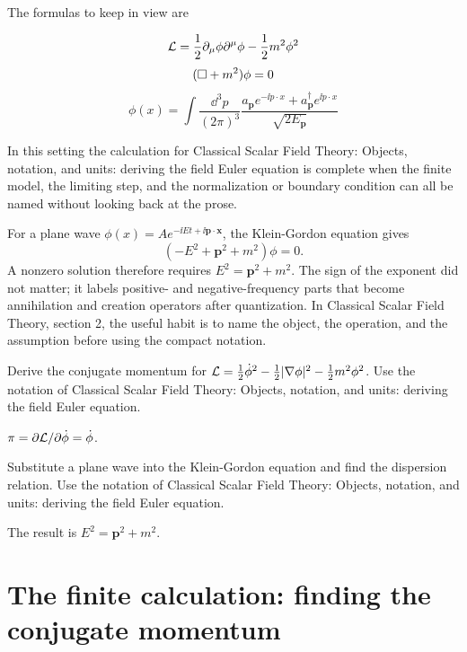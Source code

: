 The formulas to keep in view are

\[
  \mathcal L=\frac12\partial_\mu\phi\partial^\mu\phi-\frac12m^2\phi^2
\]
\[
  (\Box+m^2)\phi=0
\]
\[
  \phi(x)=\int\frac{\dd^3p}{(2\pi)^3}\frac{a_{\bm p}e^{-\ii p\cdot x}+a_{\bm p}^\dagger e^{\ii p\cdot x}}{\sqrt{2E_{\bm p}}}
\]

In this setting the calculation for Classical Scalar Field Theory: Objects, notation, and units: deriving the field Euler equation is complete when the finite model, the limiting step, and the normalization or boundary condition can all be named without looking back at the prose.




\begin{example}
For a plane wave \(\phi(x)=Ae^{-\ii Et+\ii\bm p\cdot\bm x}\), the Klein-Gordon equation gives
\[
  (-E^2+\bm p^2+m^2)\phi=0.
\]
A nonzero solution therefore requires \(E^2=\bm p^2+m^2\).  The sign of the exponent did not matter; it labels positive- and negative-frequency parts that become annihilation and creation operators after quantization.  In Classical Scalar Field Theory, section 2, the useful habit is to name the object, the operation, and the assumption before using the compact notation.
\end{example}



\begin{exercise}
Derive the conjugate momentum for \(\mathcal L=\frac12\dot\phi^2-\frac12|\nabla\phi|^2-\frac12m^2\phi^2\).  Use the notation of Classical Scalar Field Theory: Objects, notation, and units: deriving the field Euler equation.
\begin{answer}
\(\pi=\partial\mathcal L/\partial\dot\phi=\dot\phi\).
\end{answer}
\end{exercise}

\begin{exercise}
Substitute a plane wave into the Klein-Gordon equation and find the dispersion relation.  Use the notation of Classical Scalar Field Theory: Objects, notation, and units: deriving the field Euler equation.
\begin{answer}
The result is \(E^2=\bm p^2+m^2\).
\end{answer}
\end{exercise}



\section{The finite calculation: finding the conjugate momentum}

